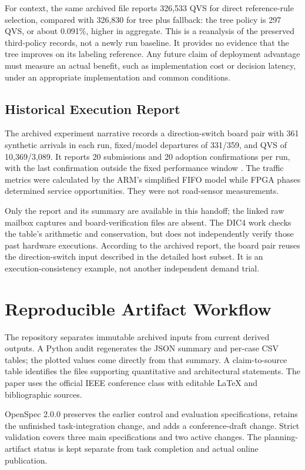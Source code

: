 \documentclass[conference]{IEEEtran}
\begin{document}
For context, the same archived file reports 326,533 QVS for direct reference-rule selection, compared with 326,830 for tree plus fallback: the tree policy is 297 QVS, or about 0.091\%, higher in aggregate. This is a reanalysis of the preserved third-policy records, not a newly run baseline. It provides no evidence that the tree improves on its labeling reference. Any future claim of deployment advantage must measure an actual benefit, such as implementation cost or decision latency, under an appropriate implementation and common conditions.

\subsection{Historical Execution Report}
The archived experiment narrative records a direction-switch board pair with 361 synthetic arrivals in each run, fixed/model departures of 331/359, and QVS of 10,369/3,089. It reports 20 submissions and 20 adoption confirmations per run, with the last confirmation outside the fixed performance window \cite{projectreport}. The traffic metrics were calculated by the ARM's simplified FIFO model while FPGA phases determined service opportunities. They were not road-sensor measurements.

Only the report and its summary are available in this handoff; the linked raw mailbox captures and board-verification files are absent. The DIC4 work checks the table's arithmetic and conservation, but does not independently verify those past hardware executions. According to the archived report, the board pair reuses the direction-switch input described in the detailed host subset. It is an execution-consistency example, not another independent demand trial.

\section{Reproducible Artifact Workflow}
The repository separates immutable archived inputs from current derived outputs. A Python audit regenerates the JSON summary and per-case CSV tables; the plotted values come directly from that summary. A claim-to-source table identifies the files supporting quantitative and architectural statements. The paper uses the official IEEE conference class with editable LaTeX and bibliographic sources.

OpenSpec 2.0.0 \cite{openspec} preserves the earlier control and evaluation specifications, retains the unfinished task-integration change, and adds a conference-draft change. Strict validation covers three main specifications and two active changes. The planning-artifact status is kept separate from task completion and actual online publication.
\end{document}
